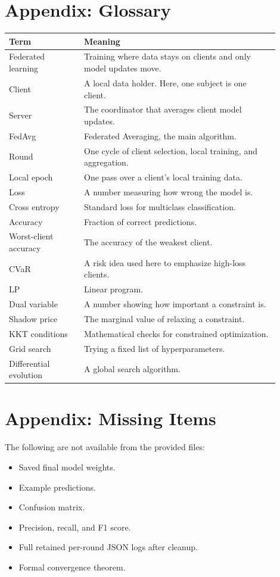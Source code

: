 \documentclass{article}
\begin{document}
\section{Appendix: Glossary}
\begin{longtable}{p{0.25\linewidth}p{0.65\linewidth}}
\toprule
Term & Meaning \\
\midrule
Federated learning & Training where data stays on clients and only model updates move. \\
Client & A local data holder. Here, one subject is one client. \\
Server & The coordinator that averages client model updates. \\
FedAvg & Federated Averaging, the main algorithm. \\
Round & One cycle of client selection, local training, and aggregation. \\
Local epoch & One pass over a client's local training data. \\
Loss & A number measuring how wrong the model is. \\
Cross entropy & Standard loss for multiclass classification. \\
Accuracy & Fraction of correct predictions. \\
Worst-client accuracy & The accuracy of the weakest client. \\
CVaR & A risk idea used here to emphasize high-loss clients. \\
LP & Linear program. \\
Dual variable & A number showing how important a constraint is. \\
Shadow price & The marginal value of relaxing a constraint. \\
KKT conditions & Mathematical checks for constrained optimization. \\
Grid search & Trying a fixed list of hyperparameters. \\
Differential evolution & A global search algorithm. \\
\bottomrule
\end{longtable}

\section{Appendix: Missing Items}
The following are not available from the provided files:
\begin{itemize}
  \item Saved final model weights.
  \item Example predictions.
  \item Confusion matrix.
  \item Precision, recall, and F1 score.
  \item Full retained per-round JSON logs after cleanup.
  \item Formal convergence theorem.
\end{itemize}
\end{document}
